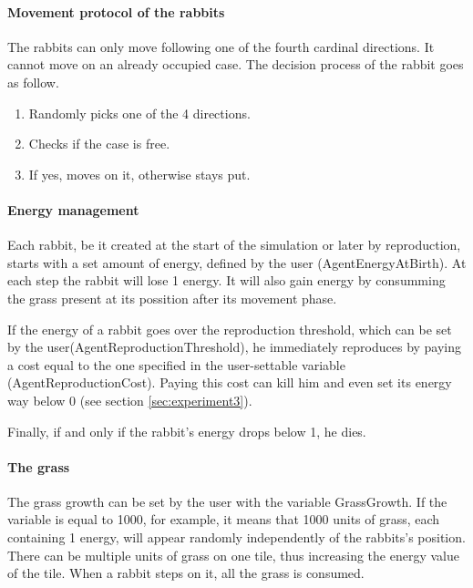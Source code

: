 \documentclass[11pt]{article}
\begin{document}
\paragraph{Movement protocol of the rabbits} The rabbits can only move following one of the fourth cardinal directions. It cannot move on an already occupied case. The decision process of the rabbit goes as follow.

\begin{enumerate}
  \item Randomly picks one of the 4 directions.
  \item Checks if the case is free.
  \item If yes, moves on it, otherwise stays put.
\end{enumerate}

\paragraph{Energy management} Each rabbit, be it created at the start of the simulation or later by reproduction, starts with a set amount of energy, defined by the user (AgentEnergyAtBirth). At each step the rabbit will lose 1 energy. It will also gain energy by consumming the grass present at its possition after its movement phase.%

If the energy of a rabbit goes over the reproduction threshold, which can be set by the user(AgentReproductionThreshold), he immediately reproduces by paying a cost equal to the one specified in the user-settable variable (AgentReproductionCost). Paying this cost can kill him and even set its energy way below 0 (see section \ref{sec:experiment3}).

Finally, if and only if the rabbit's energy drops below 1, he dies. 

\paragraph{The grass} The grass growth can be set by the user with the variable GrassGrowth. If the variable is equal to 1000, for example, it means that 1000 units of grass, each containing 1 energy, will appear randomly independently of the rabbits's position. There can be multiple units of grass on one tile, thus increasing the energy value of the tile. When a rabbit steps on it, all the grass is consumed.
\end{document}
